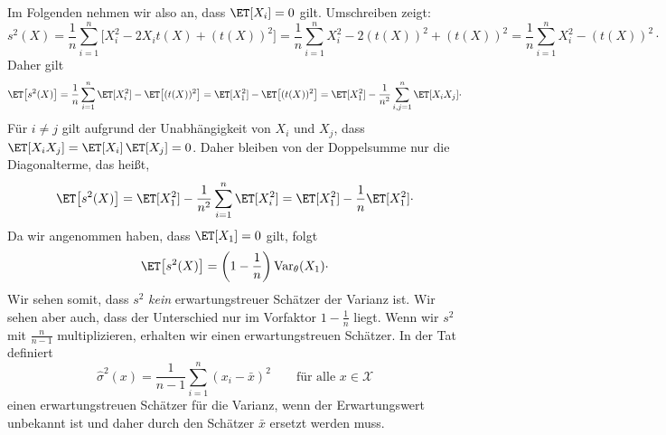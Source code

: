 \begin{bsp}
    Im Folgenden nehmen wir also an, dass $\ET[X_i]=0$ gilt.
    Umschreiben zeigt:
    \[
        s^2(X) = \frac1n\sum_{i=1}^n\Big[X_i^2 - 2X_i t(X) + (t(X))^2\Big] = \frac1n\sum_{i=1}^n X_i^2 - 2(t(X))^2 + (t(X))^2 = \frac1n\sum_{i=1}^n X_i^2 - (t(X))^2 \cdot
    \]
    Daher gilt
    \[
        \ET\big[s^2(X)\big] = \frac1n\sum_{i=1}^n \ET[X_i^2] - \ET\big[(t(X))^2\big] = \ET[X_1^2] - \ET\big[(t(X))^2\big] = \ET[X_1^2] - \frac{1}{n^2}\sum_{i,j=1}^n \ET[X_i X_j] \cdot
    \]
    Für $i\neq j$ gilt aufgrund der Unabhängigkeit von $X_i$ und $X_j$, dass $\ET[X_i X_j] = \ET[X_i]\,\ET[X_j] = 0$.
    Daher bleiben von der Doppelsumme nur die Diagonalterme, das heißt,
    \[
        \ET\big[s^2(X)\big] = \ET[X_1^2] - \frac{1}{n^2}\sum_{i=1}^n \ET[X_i^2] = \ET[X_1^2] - \frac1n\ET[X_1^2] \cdot
    \]
    Da wir angenommen haben, dass $\ET[X_1]=0$ gilt, folgt
    \[
        \ET\big[s^2(X)\big] = \left(1-\frac1n\right)\mathrm{Var}_\theta(X_1) \cdot
    \]
    Wir sehen somit, dass $s^2$ \emph{kein} erwartungstreuer \gls{Schätzer} der Varianz ist.
    Wir sehen aber auch, dass der Unterschied nur im Vorfaktor $1-\frac1n$ liegt.
    Wenn wir $s^2$ mit $\frac{n}{n-1}$ multiplizieren, erhalten wir einen erwartungstreuen \gls{Schätzer}.
    In der Tat definiert
    \[
        \widehat\sigma^2(x) = \frac{1}{n-1}\sum_{i=1}^n (x_i-\bar x)^2 \qquad \text{für alle } x\in\mathcal X
    \]
    einen erwartungstreuen \gls{Schätzer} für die Varianz, wenn der Erwartungswert unbekannt ist und daher durch den \gls{Schätzer} $\bar x$ ersetzt werden muss.
\end{bsp}

